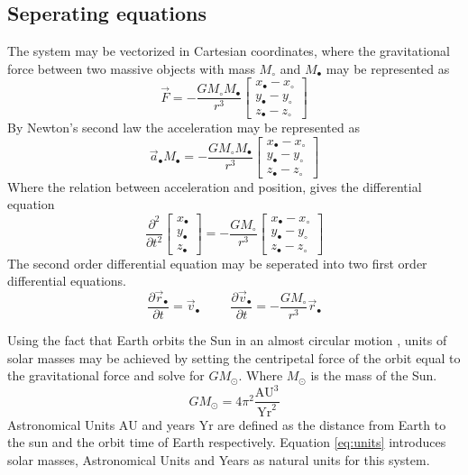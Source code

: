\documentclass[twoside,twocolumn]{article}
\newcommand{\nl}{
	
	\medskip
	\noindent
}
\newcommand{\sun}{\odot}
\newcommand{\planet}{\bullet}
\newcommand{\AU}{\text{AU}}
\newcommand{\Yr}{\text{Yr}}
\begin{document}
\subsection{Seperating equations}
The system may be vectorized in Cartesian coordinates, where the gravitational force between two massive objects with mass $M_\circ$ and $M_\planet$ may be represented as 
\begin{equation}
\vec F=-\frac{GM_\circ M_\planet}{r^3}\begin{bmatrix}
x_\planet-x_\circ\\
y_\planet-y_\circ\\
z_\planet-z_\circ
\end{bmatrix}
\end{equation}
By Newton's second law the acceleration may be represented as
\begin{equation*}
\vec a_\planet M_\planet=-\frac{GM_\circ M_\planet}{r^3}\begin{bmatrix}
x_\planet-x_\circ\\
y_\planet-y_\circ\\
z_\planet-z_\circ
\end{bmatrix}
\end{equation*}
Where the relation between acceleration and position, gives the differential equation
\begin{equation*}
\frac{\partial^2}{\partial t^2}\begin{bmatrix}
x_\planet\\
y_\planet\\
z_\planet
\end{bmatrix}
 =-\frac{GM_\circ}{r^3}\begin{bmatrix}
x_\planet-x_\circ\\
y_\planet-y_\circ\\
z_\planet-z_\circ
\end{bmatrix}
\end{equation*}
The second order differential equation may be seperated into two first order differential equations.
\begin{equation*}
\frac{\partial \vec r_\planet}{\partial t} = \vec v_\planet\hspace{1cm}
\frac{\partial \vec v_\planet}{\partial t} =-\frac{GM_\circ}{r^3}\vec r_\planet
\end{equation*}

Using the fact that Earth orbits the Sun in an almost circular motion \citep{NASA:orbit}, units of solar masses may be achieved by setting the centripetal force of the orbit equal to the gravitational force and solve for $GM_\sun$. Where $M_\sun$ is the mass of the Sun.
\begin{equation}
GM_\sun = 4\pi^2 \frac{\AU^3}{\Yr^2} \label{eq:units}
\end{equation}
Astronomical Units $\AU$ and years $\Yr$ are defined as the distance from Earth to the sun and the orbit time of Earth respectively. Equation \ref{eq:units} introduces solar masses, Astronomical Units and Years as natural units for this system.\nl
\end{document}
